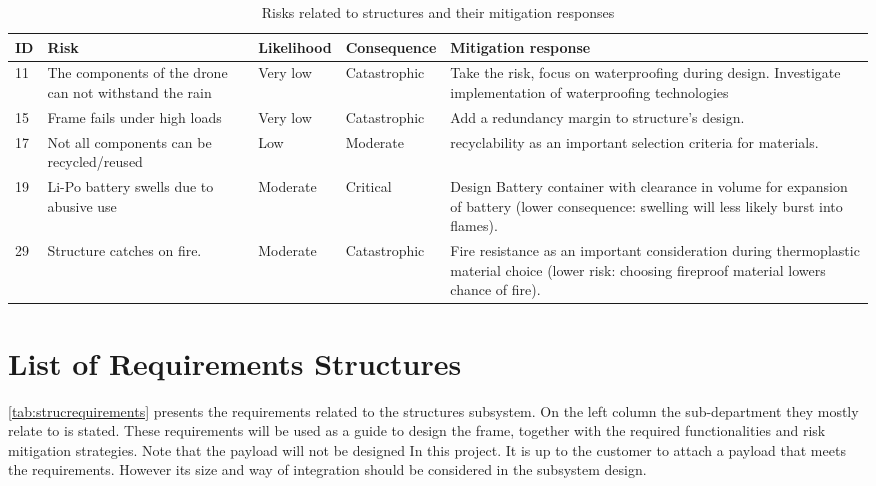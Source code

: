 \begin{scriptsize}
\begin{longtable}[c]{|p{}|p{4cm}|p{}|p{}|p{6cm}|}
\caption{Risks related to structures and their mitigation responses}
\label{tab:riskstructures}\\
\hline
\textbf{ID} & \textbf{Risk} & \textbf{Likelihood} & \textbf{Consequence} & \textbf{Mitigation response} \\ \hline
\endfirsthead
%
\endhead
%
11& The components of the drone can not withstand the rain& Very low & Catastrophic & Take the risk, focus on waterproofing during design. Investigate implementation of waterproofing technologies \\ \hline
15 & Frame fails under high loads & Very low & Catastrophic & Add a redundancy margin to structure's design.\\ \hline
17 & Not all components can be recycled/reused & Low & Moderate & recyclability as an important selection criteria for materials.\\ \hline
19 & Li-Po battery swells due to abusive use & Moderate & Critical & Design Battery container with clearance in volume for expansion of battery (lower consequence: swelling will less likely burst into flames).\\ \hline
29 & Structure catches on fire.& Moderate & Catastrophic & Fire resistance as an important consideration during thermoplastic material choice (lower risk: choosing fireproof material lowers chance of fire). \\ \hline

\end{longtable}
\end{scriptsize}


\section{List of Requirements Structures}
\label{sec:struclistofrequirements}
\autoref{tab:strucrequirements} presents the requirements related to the structures subsystem. On the left column the sub-department they mostly relate to is stated. These requirements will be used as a guide to design the frame, together with the required functionalities and risk mitigation strategies. Note that the payload will not be designed In this project. It is up to the customer to attach a payload that meets the requirements. However its size and way of integration should be considered in the subsystem design.

